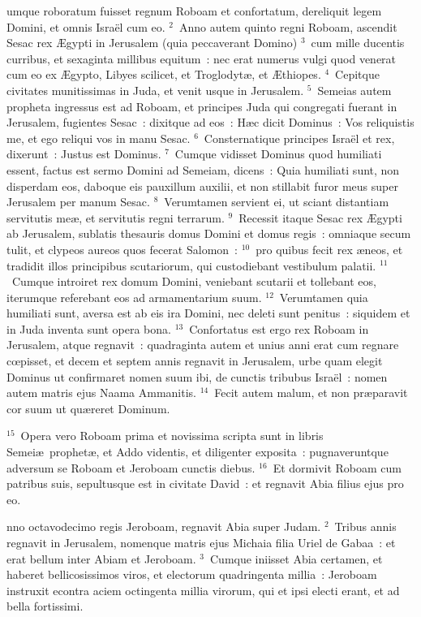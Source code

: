 \bchapter
{}umque roboratum fuisset regnum Roboam et confortatum, dereliquit legem Domini, et omnis Isra\"el cum eo.
${}^{2}$~Anno autem quinto regni Roboam, ascendit Sesac rex \AE gypti in Jerusalem (quia peccaverant Domino)
${}^{3}$~cum mille ducentis curribus, et sexaginta millibus equitum~: nec erat numerus vulgi quod venerat cum eo ex \AE gypto, Libyes scilicet, et Troglodyt\ae , et \AE thiopes.
${}^{4}$~Cepitque civitates munitissimas in Juda, et venit usque in Jerusalem.
${}^{5}$~Semeias autem propheta ingressus est ad Roboam, et principes Juda qui congregati fuerant in Jerusalem, fugientes Sesac~: dixitque ad eos~: H\ae c dicit Dominus~: Vos reliquistis me, et ego reliqui vos in manu Sesac.
${}^{6}$~Consternatique principes Isra\"el et rex, dixerunt~: Justus est Dominus.
${}^{7}$~Cumque vidisset Dominus quod humiliati essent, factus est sermo Domini ad Semeiam, dicens~: Quia humiliati sunt, non disperdam eos, daboque eis pauxillum auxilii, et non stillabit furor meus super Jerusalem per manum Sesac.
${}^{8}$~Verumtamen servient ei, ut sciant distantiam servitutis me\ae , et servitutis regni terrarum.
${}^{9}$~Recessit itaque Sesac rex \AE gypti ab Jerusalem, sublatis thesauris domus Domini et domus regis~: omniaque secum tulit, et clypeos aureos quos fecerat Salomon~:
${}^{10}$~pro quibus fecit rex \ae neos, et tradidit illos principibus scutariorum, qui custodiebant vestibulum palatii.
${}^{11}$~Cumque introiret rex domum Domini, veniebant scutarii et tollebant eos, iterumque referebant eos ad armamentarium suum.
${}^{12}$~Verumtamen quia humiliati sunt, aversa est ab eis ira Domini, nec deleti sunt penitus~: siquidem et in Juda inventa sunt opera bona.
${}^{13}$~Confortatus est ergo rex Roboam in Jerusalem, atque regnavit~: quadraginta autem et unius anni erat cum regnare cœpisset, et decem et septem annis regnavit in Jerusalem, urbe quam elegit Dominus ut confirmaret nomen suum ibi, de cunctis tribubus Isra\"el~: nomen autem matris ejus Naama Ammanitis.
${}^{14}$~Fecit autem malum, et non pr\ae paravit cor suum ut qu\ae reret Dominum.


${}^{15}$~Opera vero Roboam prima et novissima scripta sunt in libris Semei\ae\ prophet\ae , et Addo videntis, et diligenter exposita~: pugnaveruntque adversum se Roboam et Jeroboam cunctis diebus.
${}^{16}$~Et dormivit Roboam cum patribus suis, sepultusque est in civitate David~: et regnavit Abia filius ejus pro eo.

\bchapter
{}nno octavodecimo regis Jeroboam, regnavit Abia super Judam.
${}^{2}$~Tribus annis regnavit in Jerusalem, nomenque matris ejus Michaia filia Uriel de Gabaa~: et erat bellum inter Abiam et Jeroboam.
${}^{3}$~Cumque iniisset Abia certamen, et haberet bellicosissimos viros, et electorum quadringenta millia~: Jeroboam instruxit econtra aciem octingenta millia virorum, qui et ipsi electi erant, et ad bella fortissimi.


